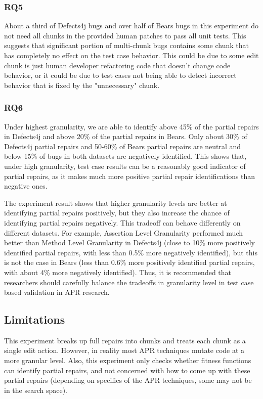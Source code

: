 \documentclass[sigconf, timestamp-false, anonymous=true]{acmart}
\begin{document}
\subsubsection{RQ5}
About a third of Defects4j bugs and over half of
Bears bugs in this experiment do not need all chunks in the provided human patches to pass
all unit tests. This suggests that significant portion of multi-chunk bugs contains some
chunk that has completely no effect on the test case behavior. This could be due to some
edit chunk is just human developer refactoring code that doesn't change code behavior,
or it could be due to test cases not being able to detect incorrect behavior that is fixed
by the "unnecessary" chunk.

\subsubsection{RQ6}

Under highest granularity, we are able to identify above 45\% of the partial repairs in Defects4j
and above 20\% of the partial repairs in Bears. Only about 30\% of Defects4j partial repairs and 50-60\%
of Bears partial repairs are neutral and below 15\% of bugs in both datasets are negatively identified. This shows that, 
under high granularity, test case results can be a reasonably good indicator of partial repairs, as it makes much
more positive partial repair identifications than negative ones.
 
The experiment result shows that higher granularity levels are better at identifying partial repairs positively, 
but they also increase the chance of identifying partial repairs negatively.
This tradeoff can behave differently on different datasets. For example,
Assertion Level Granularity performed much better than Method Level Granularity
in Defects4j (close to 10\% more positively identified partial repairs, with less than
0.5\% more negatively identified), but this is not the case in Bears (less than 0.6\%
more positively identified partial repairs, with about 4\% more negatively identified).
Thus, it is recommended that researchers should 
carefully balance the tradeoffs in granularity level in test case based validation
in APR research.


\subsection{Limitations}

This experiment breaks up full repairs into chunks and treats each chunk as a 
single edit action. However, in reality most APR techniques mutate code at 
a more granular level.
Also, this experiment only checks whether fitness functions 
can identify partial repairs, and not concerned with how to come up with these 
partial repairs (depending on specifics of the APR 
techniques, some may not be in the search space).
\end{document}
